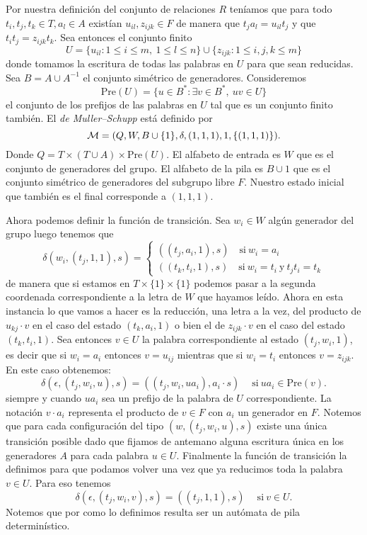 \documentclass[tesis.tex]{subfiles}
\begin{document}
	Por nuestra definición del conjunto de relaciones $R$ teníamos que para todo $t_{i}, t_{j}, t_{k} \in T, a_{l} \in A$ existían $u_{il}, z_{ijk} \in F$ de manera que 
	$t_j a_l = u_{il} t_j $ y que $ t_it_j = z_{ijk}t_k $. 
	Sea entonces el conjunto finito 
	\[
	U =  \{u_{il} : 1 \le i \le m, \ 1 \le l \le n \}  \cup  \{z_{ijk} : 1 \le i,j,k \le m\} 
	\]
	donde tomamos la escritura de todas las palabras en $U$ para que sean reducidas.
	Sea $B = A \cup A^{-1}$ el conjunto simétrico de generadores.
	Consideremos 
	\[
	\text{Pre}(U) = \{ u \in B^* : \exists v \in B^*, \  uv \in U  \}
	\]
	el conjunto de los prefijos de las palabras en $U$  tal que es un conjunto finito también.
	El \emph{\APD de Muller--Schupp } está definido por 
	\[
	{\cal M }= (Q, W , B \cup \{ 1 \}, \delta, (1,1,1), 1 ,\{(1,1,1)\}).
	\]
	Donde $Q = T \times (T \cup A) \times \text{Pre}(U)$.
	El alfabeto de entrada es $W$ que es el conjunto de generadores del grupo.
	El alfabeto de la pila es $B \cup 1$ que es el conjunto simétrico de generadores del subgrupo libre $F$.
	Nuestro estado inicial que también es el final corresponde a $(1,1,1)$.

	Ahora podemos definir la función de transición. 
	Sea $w_i \in W$ algún generador del grupo luego tenemos que
	\[
	\delta(w_i,(t_j,1,1), s) =
	\begin{cases}
		((t_j,a_i,1), s) \quad \text{si} \ w_{i}=a_{i} \\
		((t_k,t_i,1), s) \quad \text{si} \ w_{i}=t_{i} \ \text{y} \ t_{j}t_{i} = t_{k}
	\end{cases}\]
	de manera que si estamos en $T \times \{ 1 \} \times \{ 1 \}$ podemos pasar a la segunda coordenada correspondiente a la letra de $W$ que hayamos leído.	
	Ahora en esta instancia lo que vamos a hacer es la reducción, una letra a la vez, del producto de $u_{kj} \cdot v$ en el caso del estado $(t_k,a_i,1)$ o bien el de $z_{ijk} \cdot v$ en el caso del estado $(t_k,t_i,1)$.
	Sea entonces $v \in U$ la palabra correspondiente al estado $(t_{j},w_{i},1)$, es decir que si $w_{i} = a_{i}$ entonces $v = u_{ij}$ mientras que si $w_{i} = t_{i}$ entonces $v = z_{ijk}$. 
	En este caso obtenemos:
	\begin{equation*}
		\delta(\epsilon,(t_j,w_i,u), s) = ((t_j,w_i,u a_i), a_{i} \cdot s) \quad \ \text{si} \ ua_{i} \in \text{Pre}(v).
	\end{equation*}
	siempre y cuando $ua_i$ sea un prefijo de la palabra de $U$ correspondiente.
	La notación $v \cdot a_{i}$ representa el producto de $v \in F$ con $a_{i}$ un generador en $F$.
	Notemos que para cada configuración del tipo $(w,(t_{j}, w_{i}, u),s)$ existe una única transición posible dado que fijamos de antemano alguna escritura única en los generadores $A$ para cada palabra $u \in U$.
	Finalmente la función de transición la definimos para que podamos volver una vez que ya reducimos toda la palabra $v \in U$.
	Para eso tenemos 
	\begin{equation*}
		\delta(\epsilon,(t_j,w_i,v), s) = ((t_j,1,1), s) \quad \ \text{si} \ v \in U.		
	\end{equation*}	
	Notemos que por como lo definimos resulta ser un autómata de pila determinístico.
\end{document}
